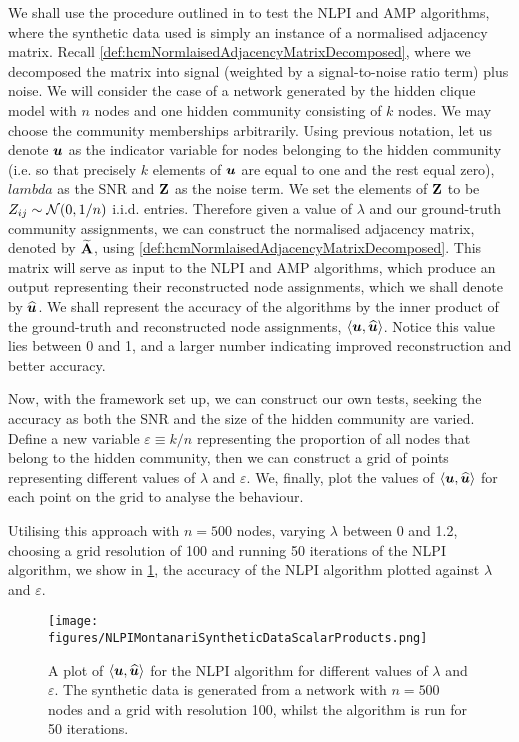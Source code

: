 We shall use the procedure outlined in \cite{Mon13} to test the NLPI and AMP algorithms, where the synthetic data used is simply an instance of a normalised adjacency matrix. Recall \cref{def:hcmNormlaisedAdjacencyMatrixDecomposed}, where we decomposed the matrix into signal (weighted by a signal-to-noise ratio term) plus noise.
We will consider the case of a network generated by the hidden clique model with $n$ nodes and one hidden community consisting of $k$ nodes.
We may choose the community memberships arbitrarily. Using previous notation, let us denote $\vecvar{u}$ as the indicator variable for nodes belonging to the hidden community (i.e. so that precisely $k$ elements of $\vecvar{u}$ are equal to one and the rest equal zero), $lambda$ as the SNR and $\mathbf Z$ as the noise term.
We set the elements of $\mathbf Z$ to be $Z_{ij} \sim \normal{0,1/n}$ i.i.d. entries. Therefore given a value of $\lambda$ and our ground-truth community assignments, we can construct the normalised adjacency matrix, denoted by $\widetilde{\mathbf A}$, using \cref{def:hcmNormlaisedAdjacencyMatrixDecomposed}.
This matrix will serve as input to the NLPI and AMP algorithms, which produce an output representing their reconstructed node assignments, which we shall denote by $\widehat{\vecvar{u}}$.
We shall represent the accuracy of the algorithms by the inner product of the ground-truth and reconstructed node assignments, $\innerP{\vecvar{u},\widehat{\vecvar{u}}}$.
Notice this value lies between 0 and 1, and a larger number indicating improved reconstruction and better accuracy.

Now, with the framework set up, we can construct our own tests, seeking the accuracy as both the SNR and the size of the hidden community are varied.
Define a new variable $\varepsilon \equiv k/n$ representing the proportion of all nodes that belong to the hidden community, then we can construct a grid of points representing different values of $\lambda$ and $\varepsilon$.
We, finally, plot the values of $\innerP{\vecvar{u},\widehat{\vecvar{u}}}$ for each point on the grid to analyse the behaviour.

Utilising this approach with $n=500$ nodes, varying $\lambda$ between 0 and 1.2, choosing a grid resolution of 100 and running 50 iterations of the NLPI algorithm, we show in \cref{fig:NLPIAccuracyPlot}, the accuracy of the NLPI algorithm plotted against $\lambda$ and $\varepsilon$.

\begin{figure}
	\centering
	\texttt{[image: figures/NLPIMontanariSyntheticDataScalarProducts.png]}
	\caption[Plot of accuracy for NLPI algorithm.]{\label{fig:NLPIAccuracyPlot} A plot of $\innerP{\vecvar{u},\widehat{\vecvar{u}}}$ for the NLPI algorithm for different values of $\lambda$ and $\varepsilon$. The synthetic data is generated from a network with $n=500$ nodes and a grid with resolution 100, whilst the algorithm is run for 50 iterations.}
\end{figure}

